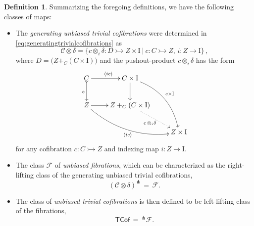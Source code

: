 \documentclass[11pt]{amsart}
\newcommand{\mono}{\ensuremath{\rightarrowtail}}
\newcommand{\ra}{\ensuremath{\rightarrow}}
\newcommand{\onto}{\ensuremath{\twoheadrightarrow}}
\newcommand{\gph}[1]{\ensuremath{\langle #1 \rangle}}
\newcommand{\I}{\ensuremath{\mathrm{I}}}
\theoremstyle{remark}
\theoremstyle{definition}
\newtheorem{definition}[theorem]{Definition}
\begin{document}
\begin{definition}\label{def:FibWFSclasses}
Summarizing the foregoing definitions, we have the following classes of maps:


%
%

\begin{itemize}
\item  The \emph{generating unbiased trivial cofibrations} were determined in \eqref{eq:generatingtrivialcofibrations} as
\begin{equation}\label{eq:genunbiasedTCof}
\mathcal{C}\otimes\delta = \{c \otimes_i \delta : D \mono Z\times\I\ |\  c : C\mono Z,\, i : Z \ra \I\}\,,
\end{equation}
where $D = \big(Z +_C (C\times\I)\big)$ and the pushout-product $c\otimes_i \delta$ has the form
\begin{equation}\label{diagram:unbiasedbasicpushoutproduct2}
\xymatrix{
C \ar@{>->}[d]_{c} \ar[r]^{\gph{ic}} & C\times \I \ar[d] \ar@/^4ex/ [rdd]^{c\times\I}\\
Z \ar@/_4ex/ [rrd]_{\gph{ic}} \ar[r] &  Z +_C (C\times\I) \ar@{.>}[rd]_{c\, \otimes_i \delta} \\
&& Z\times\I
}
\end{equation}
for any cofibration $c : C\mono Z$ and indexing map $i: Z \ra \I$.

\item The class $\mathcal{F}$ of \emph{unbiased fibrations}, which can be characterized as the right-lifting class of the generating unbiased trivial cofibrations,
\[
(\mathcal{C}\otimes\delta)^\pitchfork\, =\,\mathcal{F}.
\]

\item The class of \emph{unbiased trivial cofibrations} is then defined to be left-lifting class of the fibrations,
\[
\mathsf{TCof}\, =\, ^{\pitchfork}\mathcal{F}.
\]
\end{itemize}
\end{definition}
\end{document}
